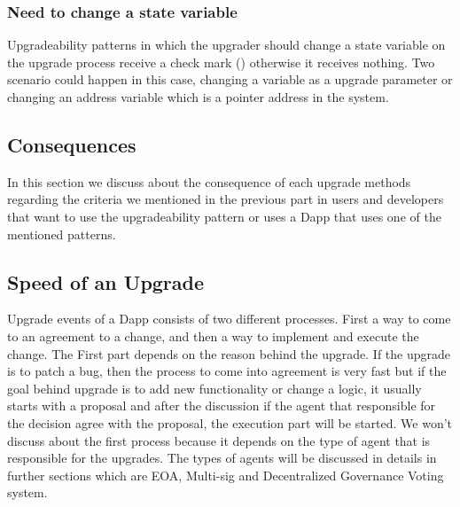 \subsubsection{Need to change a state variable}
Upgradeability patterns in which the upgrader should change a state variable on the upgrade process receive a check mark (\checkmark) otherwise it receives nothing. Two scenario could happen in this case, changing a variable as a upgrade parameter or changing an address variable which is a pointer address in the system. 



\subsection{Consequences}
In this section we discuss about the consequence of each upgrade methods regarding the criteria we mentioned in the previous part in users and developers that want to use the upgradeability pattern or uses a Dapp that uses one of the mentioned patterns.

\subsection{Speed of an Upgrade}
Upgrade events of a Dapp consists of two different processes. First a way to come to an agreement to a change, and then a way to implement and execute the change. The First part depends on the reason behind the upgrade. If the upgrade is to patch a bug, then the process to come into agreement is very fast but if the goal behind upgrade is to add new functionality or change a logic, it usually starts with a proposal and after the discussion if the agent that responsible for the decision agree with the proposal, the execution part will be started. We won't discuss about the first process because it depends on the type of agent that is responsible for the upgrades. The types of agents will be discussed in details in further sections which are EOA, Multi-sig and Decentralized Governance Voting system. 

